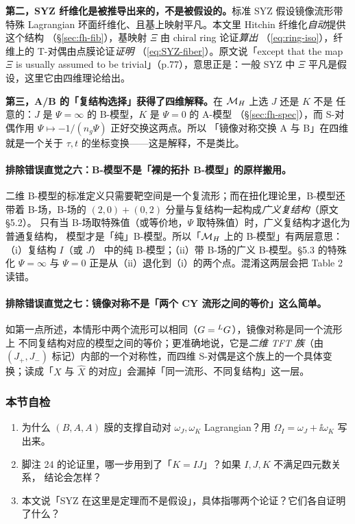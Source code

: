 \textbf{第二，SYZ 纤维化是被推导出来的，不是被假设的。}标准 SYZ 假设镜像流形带特殊
Lagrangian 环面纤维化、且基上映射平凡。本文里 Hitchin 纤维化\emph{自动}提供这个结构
（§\ref{sec:fh-fib}），基映射 $\Xi$ 由 chiral ring 论证\emph{算出}
（\eqref{eq:ring-iso}），纤维上的 T-对偶由点膜论证\emph{证明}
（\eqref{eq:SYZ-fiber}）。原文说「except that the map $\Xi$ is usually assumed to be
trivial」（p.77），意思正是：一般 SYZ 中 $\Xi$ 平凡是假设，这里它由四维理论给出。
\pA{}

\textbf{第三，A/B 的「复结构选择」获得了四维解释。}在 $\mathcal{M}_H$ 上选 $J$ 还是 $K$ 不是
任意的：$J$ 是 $\Psi=\infty$ 的 B-模型，$K$ 是 $\Psi=0$ 的 A-模型
（§\ref{sec:fh-spec}），而 S-对偶作用 $\Psi\mapsto-1/(n_g\Psi)$ 正好交换这两点。所以
「镜像对称交换 A 与 B」在四维就是一个关于 $\tau,t$ 的坐标变换——这是解释，不是类比。
\pA{}

\paragraph{排除错误直觉之六：B-模型不是「裸的拓扑 B-模型」的原样搬用。}
二维 B-模型的标准定义只需要靶空间是一个复流形；而在扭化理论里，B-模型还带着
B-场，B-场的 $(2,0)+(0,2)$ 分量与复结构一起构成\emph{广义复结构}（原文 §5.2）。
只有当 B-场取特殊值（或等价地，$\Psi$ 取特殊值）时，广义复结构才退化为普通复结构，
模型才是「纯」B-模型。所以「$\mathcal{M}_H$ 上的 B-模型」有两层意思：（i）复结构 $I$（或 $J$）
中的纯 B-模型；（ii）带 B-场的广义 B-模型。§5.3 的特殊化 $\Psi=\infty$ 与 $\Psi=0$
正是从（ii）退化到（i）的两个点。混淆这两层会把 Table 2 读错。\pB{}

\paragraph{排除错误直觉之七：镜像对称不是「两个 CY 流形之间的等价」这么简单。}
如第一点所述，本情形中两个流形可以相同（$G={}^{L}G$），镜像对称是同一个流形上
不同复结构对应的模型之间的等价；更准确地说，它是\emph{二维 TFT 族}（由 $(J_+,J_-)$
标记）内部的一个对称性，而四维 S-对偶是这个族上的一个具体变换；读成「$X$ 与
$\hat X$ 的对应」会漏掉「同一流形、不同复结构」这一层。\pA{}

\subsubsection*{本节自检}
\begin{enumerate}
\item 为什么 $(B,A,A)$ 膜的支撑自动对 $\omega_J,\omega_K$ Lagrangian？用
  $\Omega_I=\omega_J+\ii\omega_K$ 写出来。
\item 脚注 24 的论证里，哪一步用到了「$K=IJ$」？如果 $I,J,K$ 不满足四元数关系，
  结论会怎样？
\item 本文说「SYZ 在这里是定理而不是假设」，具体指哪两个论证？它们各自证明了什么？
\end{enumerate}

